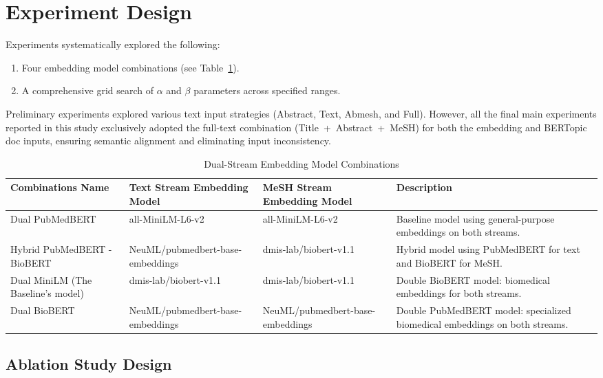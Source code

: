 \documentclass[utf8]{FrontiersinHarvard}
\begin{document}
\section{Experiment Design}
Experiments systematically explored the following:
\begin{enumerate}[leftmargin=*,label=\arabic*)]
    \item Four embedding model combinations (see Table~\ref{tab:model_combinations}).
    \item A comprehensive grid search of $\alpha$ and $\beta$ parameters across specified ranges.
\end{enumerate}

Preliminary experiments explored various text input strategies (Abstract, Text, Abmesh, and Full). However, all the final main experiments reported in this study exclusively adopted the full-text combination (Title~+~Abstract~+~MeSH) for both the embedding and BERTopic doc inputs, ensuring semantic alignment and eliminating input inconsistency.
\begin{table}[!ht]
\caption{Dual-Stream Embedding Model Combinations}
\label{tab:model_combinations}
\centering
\renewcommand{\arraystretch}{1.3}
\begin{tabular}{p{3.2cm}p{4.2cm}p{4cm}p{4.8cm}}
\hline
\textbf{Combinations Name} & \textbf{Text Stream Embedding Model} & \textbf{MeSH Stream Embedding Model} & \textbf{Description} \\
\hline
Dual PubMedBERT & all-MiniLM-L6-v2 & all-MiniLM-L6-v2 & Baseline model using general-purpose embeddings on both streams. \\
\hline
Hybrid PubMedBERT - BioBERT & NeuML/pubmedbert-base-embeddings & dmis-lab/biobert-v1.1 & Hybrid model using PubMedBERT for text and BioBERT for MeSH. \\
\hline
Dual MiniLM (The Baseline's model) & dmis-lab/biobert-v1.1 & dmis-lab/biobert-v1.1 & Double BioBERT model: biomedical embeddings for both streams. \\
\hline
Dual BioBERT & NeuML/pubmedbert-base-embeddings & NeuML/pubmedbert-base-embeddings & Double PubMedBERT model: specialized biomedical embeddings on both streams. \\
\hline
\end{tabular}
\end{table}

\subsection{Ablation Study Design}
\end{document}

